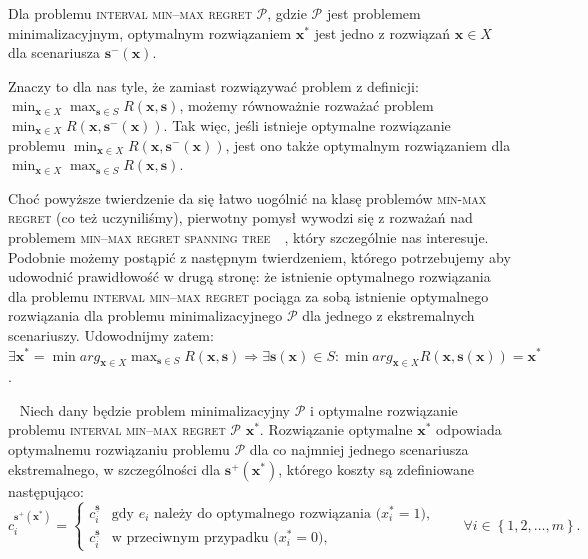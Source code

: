 \begin{corollary}
	Dla problemu \textsc{interval min--max regret $\mathcal{P}$}, gdzie $\mathcal{P}$ jest problemem minimalizacyjnym, optymalnym rozwiązaniem $\textbf{x}^{\ast}$ jest jedno z rozwiązań $\textbf{x} \in X$ dla scenariusza $\textbf{s}^{-} \left( \textbf{x} \right)$.
\end{corollary}

Znaczy to dla nas tyle, że zamiast rozwiązywać problem z definicji: $\min_{\textbf{x} \in X} \max_{\textbf{s} \in S} R \left( \textbf{x}, \textbf{s} \right)$, możemy równoważnie rozważać problem $\min_{\textbf{x} \in X} R \left( \textbf{x}, \textbf{s}^{-} \left( \textbf{x} \right) \right)$. Tak więc, jeśli istnieje optymalne rozwiązanie problemu $\min_{\textbf{x} \in X} R \left( \textbf{x}, \textbf{s}^{-} \left( \textbf{x} \right) \right)$, jest ono także optymalnym rozwiązaniem dla $\min_{\textbf{x} \in X} \max_{\textbf{s} \in S} R \left( \textbf{x}, \textbf{s} \right)$.

Choć powyższe twierdzenie da się łatwo uogólnić na klasę problemów \textsc{min-max regret} (co też uczyniliśmy), pierwotny pomysł wywodzi się z rozważań nad problemem \textsc{min--max regret spanning tree}~\cite[$429$--$430$]{minmaxSurvey}~\cite{robustSTP}, który szczególnie nas interesuje. Podobnie możemy postąpić z następnym twierdzeniem, którego potrzebujemy aby udowodnić prawidłowość w drugą stronę: że istnienie optymalnego rozwiązania dla problemu \textsc{interval min--max regret} pociąga za sobą istnienie optymalnego rozwiązania dla problemu minimalizacyjnego $\mathcal{P}$ dla jednego z ekstremalnych scenariuszy. Udowodnijmy zatem: $\exists \textbf{x}^{\ast} = \min arg_{\textbf{x} \in X} \max_{\textbf{s} \in S} R \left( \textbf{x}, \textbf{s} \right) \Rightarrow \exists \textbf{s} \left( \textbf{x} \right) \in S : \min arg_{\textbf{x} \in X} R \left( \textbf{x}, \textbf{s} \left( \textbf{x} \right) \right) = \textbf{x}^{\ast}$.

\begin{theorem}\label{th:intminmaxreg2}~\cite[$432$]{minmaxSurvey}
	Niech dany będzie problem minimalizacyjny $\mathcal{P}$ i optymalne rozwiązanie problemu \textsc{interval min--max regret $\mathcal{P}$} $\textbf{x}^{\ast}$. Rozwiązanie optymalne $\textbf{x}^{\ast}$ odpowiada optymalnemu rozwiązaniu problemu $\mathcal{P}$ dla co najmniej jednego scenariusza ekstremalnego, w szczególności dla $\textbf{s}^{+} \left( \textbf{x}^{\ast} \right)$, którego koszty są zdefiniowane następująco:
	\begin{equation}
		c^{\textbf{s}^{+} \left( \textbf{x}^{\ast} \right)}_{i} = \left\{\begin{matrix}
			c^{\underline{\textbf{s}}}_{i} & \text{gdy $e_{i}$ należy do optymalnego rozwiązania ($x^{\ast}_{i} = 1$),}\\ 
			c^{\underline{\textbf{s}}}_{i} &  \text{w przeciwnym przypadku ($x^{\ast}_{i} = 0$),}
		\end{matrix}\right. \qquad \forall i \in \left\{ 1, 2, \dots, m \right\}\text{.}
	\end{equation}
\end{theorem}

